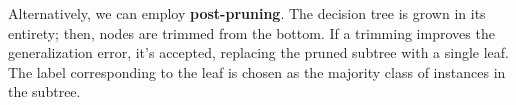 Alternatively, we can employ \textbf{post-pruning}. The decision tree is grown in its entirety; then, nodes are trimmed from the bottom. If a trimming improves the generalization error, it's accepted, replacing the pruned subtree with a single leaf. The label corresponding to the leaf is chosen as the majority class of instances in the subtree.
